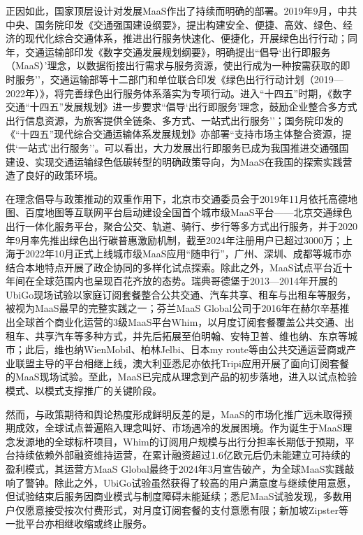 正因如此，国家顶层设计对发展MaaS作出了持续而明确的部署。2019年9月，中共中央、国务院印发《交通强国建设纲要》，提出构建安全、便捷、高效、绿色、经济的现代化综合交通体系，推进出行服务快速化、便捷化，开展绿色出行行动；同年，交通运输部印发《数字交通发展规划纲要》，明确提出``倡导`出行即服务（MaaS）'理念，以数据衔接出行需求与服务资源，使出行成为一种按需获取的即时服务''，交通运输部等十二部门和单位联合印发《绿色出行行动计划（2019—2022年）》，将完善绿色出行服务体系落实为专项行动。进入``十四五''时期，《数字交通``十四五''发展规划》进一步要求``倡导`出行即服务'理念，鼓励企业整合多方式出行信息资源，为旅客提供全链条、多方式、一站式出行服务''；国务院印发的《``十四五''现代综合交通运输体系发展规划》亦部署``支持市场主体整合资源，提供`一站式'出行服务''。可以看出，大力发展出行即服务已成为我国推进交通强国建设、实现交通运输绿色低碳转型的明确政策导向，为MaaS在我国的探索实践营造了良好的政策环境。


在理念倡导与政策推动的双重作用下，北京市交通委员会于2019年11月依托高德地图、百度地图等互联网平台启动建设全国首个城市级MaaS平台——北京交通绿色出行一体化服务平台，聚合公交、轨道、骑行、步行等多方式出行服务，并于2020年9月率先推出绿色出行碳普惠激励机制，截至2024年注册用户已超过3000万；上海于2022年10月正式上线城市级MaaS应用``随申行''，广州、深圳、成都等城市亦结合本地特点开展了政企协同的多样化试点探索。除此之外，MaaS试点平台近十年间在全球范围内也呈现百花齐放的态势。瑞典哥德堡于2013—2014年开展的UbiGo现场试验以家庭订阅套餐整合公共交通、汽车共享、租车与出租车等服务，被视为MaaS最早的完整实践之一\cite{sochorAddedValueNew2015,sochorTryingOutMobility2016}；芬兰MaaS Global公司于2016年在赫尔辛基推出全球首个商业化运营的3级MaaS平台Whim，以月度订阅套餐覆盖公共交通、出租车、共享汽车等多种方式，并先后拓展至伯明翰、安特卫普、维也纳、东京等城市\cite{sochorTopologicalApproachMobility2018,smithMobilityStartupMaaS2024}；此后，维也纳WienMobil、柏林Jelbi、日本my route等由公共交通运营商或产业联盟主导的平台相继上线，澳大利亚悉尼亦依托Tripi应用开展了面向订阅套餐的MaaS现场试验\cite{hensherMaaSTrialsWhat2020}。至此，MaaS已完成从理念到产品的初步落地，进入以试点检验模式、以模式支撑推广的关键阶段。

然而，与政策期待和舆论热度形成鲜明反差的是，MaaS的市场化推广远未取得预期成效，全球试点普遍陷入理念叫好、市场遇冷的发展困境。作为诞生于MaaS理念发源地的全球标杆项目，Whim的订阅用户规模与出行分担率长期低于预期，平台持续依赖外部融资维持运营，在累计融资超过1.6亿欧元后仍未能建立可持续的盈利模式，其运营方MaaS Global最终于2024年3月宣告破产\cite{smithMobilityStartupMaaS2024}，为全球MaaS实践敲响了警钟。除此之外，UbiGo试验虽然获得了较高的用户满意度与继续使用意愿，但试验结束后服务因商业模式与制度障碍未能延续\cite{sochorTryingOutMobility2016}；悉尼MaaS试验发现，多数用户仅愿意接受按次付费形式，对月度订阅套餐的支付意愿有限\cite{hensherMaaSTrialsWhat2020,hoPotentialUptakeWillingnesstopay2018}；新加坡Zipster等一批平台亦相继收缩或终止服务。

